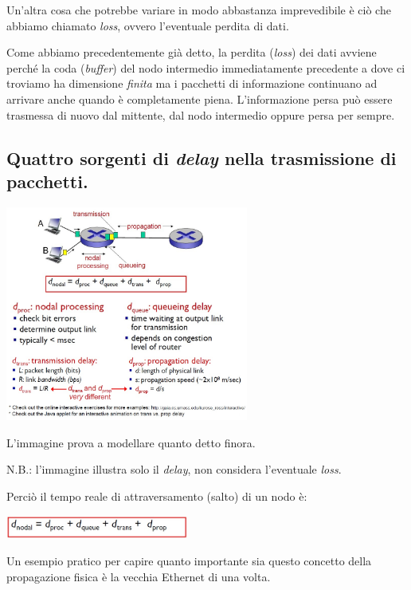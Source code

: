 \documentclass[10pt, a4paper, openany]{book}
\begin{document}
\noindent Un'altra cosa che potrebbe variare in modo abbastanza imprevedibile è ciò che abbiamo chiamato \textit{loss}, ovvero l'eventuale perdita di dati.

\noindent Come abbiamo precedentemente già detto, la perdita (\textit{loss}) dei dati avviene perché la coda (\textit{buffer}) del nodo intermedio immediatamente precedente a dove ci troviamo ha dimensione \textit{finita} ma i pacchetti di informazione continuano ad arrivare anche quando è completamente piena. L'informazione persa può essere trasmessa di nuovo dal mittente, dal nodo intermedio oppure persa per sempre.

\subsection{Quattro sorgenti di \textit{delay} nella trasmissione di pacchetti.}

\begin{center}
    \includegraphics[width=80mm]{cap1 - Introduzione alle reti - 22.jpg}
\end{center}
\noindent L'immagine prova a modellare quanto detto finora. 

\noindent N.B.: l'immagine illustra solo il \textit{delay}, non considera l'eventuale \textit{loss}.

\vspace{0.5cm}

\noindent Perciò il tempo reale di attraversamento (salto) di un nodo è:
\begin{center}
    \includegraphics[width=60mm]{cap1 - Introduzione alle reti - 23.jpg}
\end{center}

\vspace{0.5cm}
\noindent Un esempio pratico per capire quanto importante sia questo concetto della propagazione fisica è la vecchia Ethernet di una volta.
\end{document}
